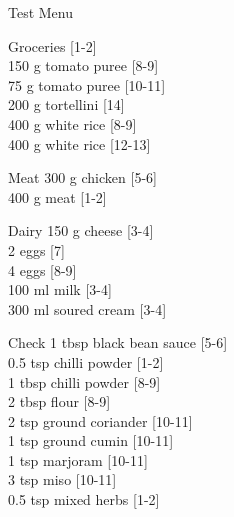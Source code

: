 \begin{menu}{Test Menu}
\begin{shoppinglist}{Groceries}
        {\scriptsize[1-2]}\\
      150 g tomato puree 
        {\scriptsize[8-9]}\\
      75 g tomato puree 
        {\scriptsize[10-11]}\\
      200 g tortellini 
        {\scriptsize[14]}\\
      400 g white rice 
        {\scriptsize[8-9]}\\
      400 g white rice 
        {\scriptsize[12-13]}\\
      \end{shoppinglist}%
      \par\vfil %
      \begin{shoppinglist}{Meat}
      300 g chicken 
        {\scriptsize[5-6]}\\
      400 g meat 
        {\scriptsize[1-2]}\\
      \end{shoppinglist}%
      \begin{shoppinglist}{Dairy}
      150 g cheese 
        {\scriptsize[3-4]}\\
      2  eggs 
        {\scriptsize[7]}\\
      4  eggs 
        {\scriptsize[8-9]}\\
      100 ml milk 
        {\scriptsize[3-4]}\\
      300 ml soured cream 
        {\scriptsize[3-4]}\\
      \end{shoppinglist}%
      \par\vfil %
      \vfil\clearpage %
      \begin{shoppinglist}{Check}
      1 tbsp black bean sauce 
        {\scriptsize[5-6]}\\
      0.5 tsp chilli powder 
        {\scriptsize[1-2]}\\
      1 tbsp chilli powder 
        {\scriptsize[8-9]}\\
      2 tbsp flour 
        {\scriptsize[8-9]}\\
      2 tsp ground coriander 
        {\scriptsize[10-11]}\\
      1 tsp ground cumin 
        {\scriptsize[10-11]}\\
      1 tsp marjoram 
        {\scriptsize[10-11]}\\
      3 tsp miso 
        {\scriptsize[10-11]}\\
      0.5 tsp mixed herbs 
        {\scriptsize[1-2]}\\

\end{shoppinglist}
\end{menu}
